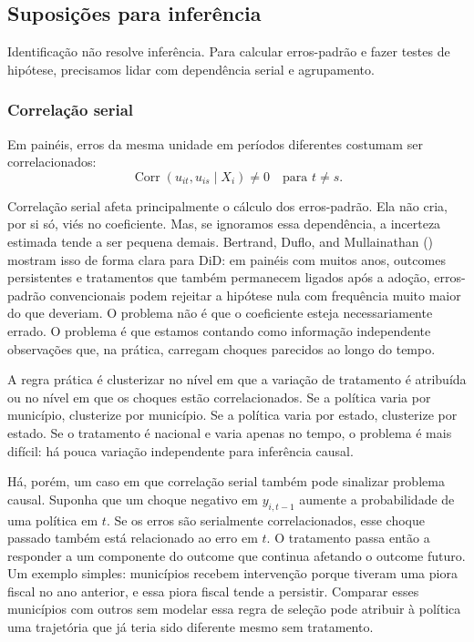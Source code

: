 \documentclass[
]{article}
\begin{document}
\subsection{Suposições para inferência}\label{suposiuxe7uxf5es-para-inferuxeancia}

Identificação não resolve inferência. Para calcular erros-padrão e fazer testes de hipótese, precisamos lidar com dependência serial e agrupamento.

\subsubsection{Correlação serial}\label{correlauxe7uxe3o-serial}

Em painéis, erros da mesma unidade em períodos diferentes costumam ser correlacionados:
\[
\operatorname{Corr}(u_{it}, u_{is} \mid X_i) \neq 0
\quad \text{para } t \neq s.
\]

Correlação serial afeta principalmente o cálculo dos erros-padrão. Ela não cria, por si só, viés no coeficiente. Mas, se ignoramos essa dependência, a incerteza estimada tende a ser pequena demais. Bertrand, Duflo, and Mullainathan () mostram isso de forma clara para DiD: em painéis com muitos anos, outcomes persistentes e tratamentos que também permanecem ligados após a adoção, erros-padrão convencionais podem rejeitar a hipótese nula com frequência muito maior do que deveriam. O problema não é que o coeficiente esteja necessariamente errado. O problema é que estamos contando como informação independente observações que, na prática, carregam choques parecidos ao longo do tempo.

A regra prática é clusterizar no nível em que a variação de tratamento é atribuída ou no nível em que os choques estão correlacionados. Se a política varia por município, clusterize por município. Se a política varia por estado, clusterize por estado. Se o tratamento é nacional e varia apenas no tempo, o problema é mais difícil: há pouca variação independente para inferência causal.

Há, porém, um caso em que correlação serial também pode sinalizar problema causal. Suponha que um choque negativo em \(y_{i,t-1}\) aumente a probabilidade de uma política em \(t\). Se os erros são serialmente correlacionados, esse choque passado também está relacionado ao erro em \(t\). O tratamento passa então a responder a um componente do outcome que continua afetando o outcome futuro. Um exemplo simples: municípios recebem intervenção porque tiveram uma piora fiscal no ano anterior, e essa piora fiscal tende a persistir. Comparar esses municípios com outros sem modelar essa regra de seleção pode atribuir à política uma trajetória que já teria sido diferente mesmo sem tratamento.
\end{document}
